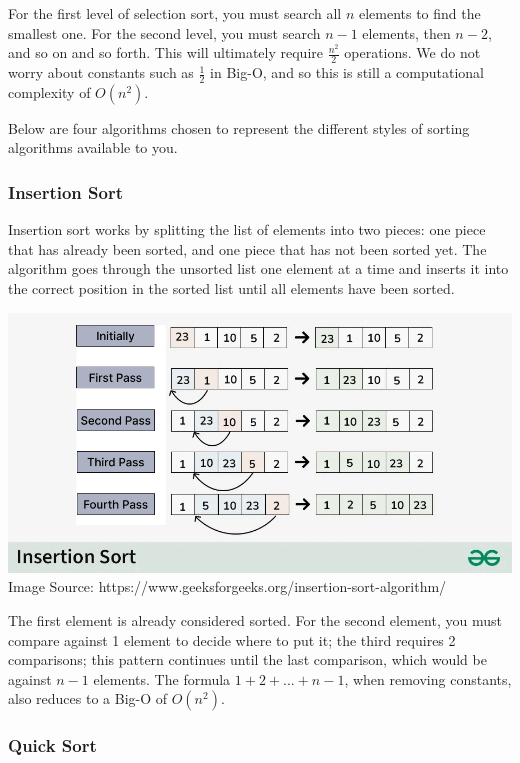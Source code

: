 For the first level of selection sort, you must search all $n$ elements to find the smallest one. For the second level, you must search $n-1$ elements, then $n-2$, and so on and so forth. This will ultimately require $\frac{n^2}{2}$ operations. We do not worry about constants such as $\frac{1}{2}$ in Big-O, and so this is still a computational complexity of $O(n^2)$.

Below are four algorithms chosen to represent the different styles of sorting algorithms available to you.

\subsubsection{Insertion Sort}

Insertion sort works by splitting the list of elements into two pieces: one piece that has already been sorted, and one piece that has not been sorted yet. The algorithm goes through the unsorted list one element at a time and inserts it into the correct position in the sorted list until all elements have been sorted.

\includegraphics[width=\textwidth]{images/Insertion-sorting.png}
Image Source: https://www.geeksforgeeks.org/insertion-sort-algorithm/

The first element is already considered sorted. For the second element, you must compare against 1 element to decide where to put it; the third requires 2 comparisons; this pattern continues until the last comparison, which would be against $n-1$ elements. The formula $1+2+...+n-1$, when removing constants, also reduces to a Big-O of $O(n^2)$.

\subsubsection{Quick Sort}

